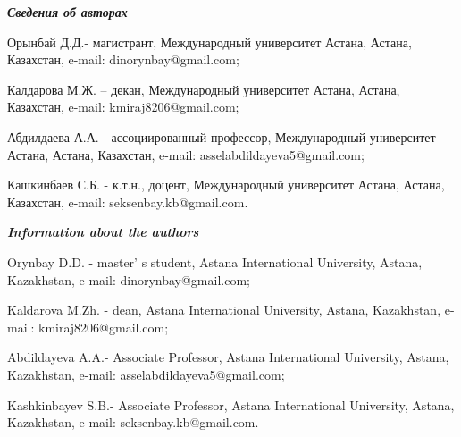 \begin{info}
\hspace{1em}\emph{{\bfseries Сведения об авторах}}

Орынбай Д.Д.- магистрант, Международный университет Астана, Астана,
Казахстан, e-mail: dinorynbay@gmail.com;

Калдарова М.Ж. -- декан, Международный университет Астана, Астана,
Казахстан, e-mail: kmiraj8206@gmail.com;

Абдилдаева А.А. - ассоциированный профессор, Международный университет
Астана, Астана, Казахстан, e-mail: asselabdildayeva5@gmail.com;

Кашкинбаев С.Б. - к.т.н., доцент, Международный университет Астана,
Астана, Казахстан, e-mail: seksenbay.kb@gmail.com.

\hspace{1em}\emph{{\bfseries Information about the authors}}

Orynbay D.D. - master' s student, Astana International
University, Astana, Kazakhstan, e-mail:
dinorynbay@gmail.com;

Kaldarova M.Zh. - dean, Astana International University, Astana,
Kazakhstan, e-mail:
kmiraj8206@gmail.com;

Abdildayeva A.A.- Associate Professor, Astana International University,
Astana, Kazakhstan, e-mail:
asselabdildayeva5@gmail.com;

Kashkinbayev S.B.- Associate Professor, Astana International University,
Astana, Kazakhstan, e-mail:
seksenbay.kb@gmail.com.
\end{info}
